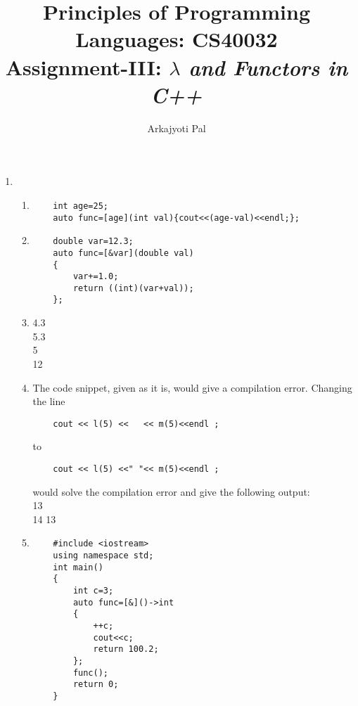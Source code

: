 \documentclass[11pt]{article}
\begin{document}
\author{Arkajyoti Pal}
\title{Principles of Programming Languages: CS40032 \\ Assignment-III: \textit{$\lambda$ and Functors in C++}}
\maketitle

\medskip


\begin{enumerate}
\item 
\begin{enumerate}
\item 
    \begin{lstlisting}
    int age=25;
    auto func=[age](int val){cout<<(age-val)<<endl;};
    \end{lstlisting}
    
\item 
    \begin{lstlisting}
    double var=12.3;
    auto func=[&var](double val)
    {
        var+=1.0;
        return ((int)(var+val));
    };
    \end{lstlisting}
\item   4.3\\
    5.3\\
    5\\
    12
\item The code snippet, given as it is, would give a compilation error. Changing the line 
    \begin{lstlisting}
    cout << l(5) <<   << m(5)<<endl ;
    \end{lstlisting}
to     \begin{lstlisting}
    cout << l(5) <<" "<< m(5)<<endl ;
    \end{lstlisting}
would solve the compilation error and give the following output: \\
13\\
14 13

\item
\begin{lstlisting}
    #include <iostream>
    using namespace std;
    int main() 
    {
        int c=3;
        auto func=[&]()->int
        {   
            ++c; 
            cout<<c;
            return 100.2; 
        };
        func();
        return 0;
    }
\end{lstlisting}
    

\end{enumerate}
\end{enumerate}
\end{document}
